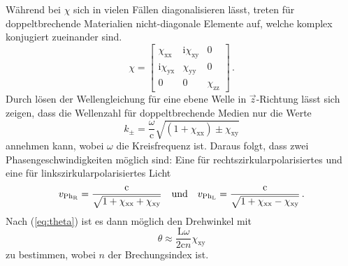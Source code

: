 Während bei $\chi$ sich in vielen Fällen diagonalisieren lässt, treten für doppeltbrechende Materialien nicht-diagonale Elemente auf, welche komplex konjugiert zueinander sind.
\begin{equation}
  \chi=
  \left[ {\begin{array}{ccc}
   \chi_\text{xx} & \text{i}\chi_\text{xy} & 0\\
   \text{i}\chi_\text{yx} & \chi_\text{yy} & 0\\
   0 & 0 &\chi_\text{zz}
  \end{array} } \right]\,.
\end{equation}
Durch lösen der Wellengleichung für eine ebene Welle in $\vec{z}$-Richtung lässt sich zeigen, dass die Wellenzahl für doppeltbrechende Medien nur die Werte
\begin{equation}
k_{\pm}=\frac{\omega}{\text{c}}\sqrt{(1+\chi_\text{xx})\pm \chi_{\text{xy}}}
\end{equation}
annehmen kann, wobei $\omega$ die Kreisfrequenz ist. Daraus folgt, dass zwei Phasengeschwindigkeiten möglich sind: Eine für rechtszirkularpolarisiertes und eine für linkszirkularpolarisiertes Licht
\begin{equation}
  \centering
v_{{\text{Ph}_\text{R}}}=\frac{\text{c}}{\sqrt{1+\chi_\text{xx}+\chi_\text{xy}}} \quad \text{und}\quad v_{{\text{Ph}_\text{L}}}=\frac{\text{c}}{\sqrt{1+\chi_\text{xx}-\chi_\text{xy}}} \,.
\end{equation}
Nach (\ref{eq:theta}) ist es dann möglich den Drehwinkel mit
\begin{equation}
  \theta \approx \frac{\text{L}\omega}{2\text{c}n}\chi_\text{xy}
\end{equation}
zu bestimmen, wobei $n$ der Brechungsindex ist.
